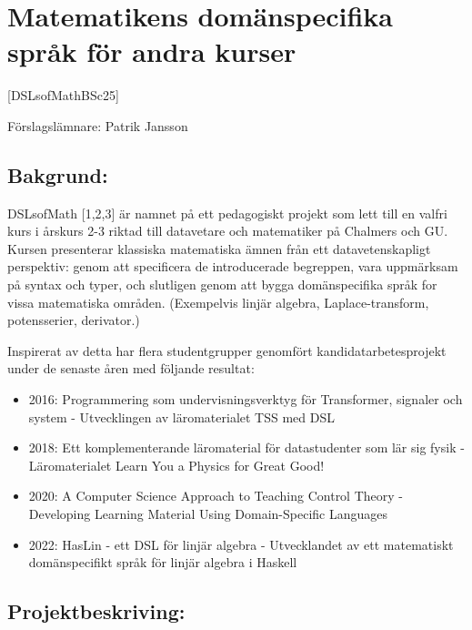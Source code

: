\documentclass{article}
\author{}
\date{}
\providecommand{\tightlist}{%
  \setlength{\itemsep}{0pt}\setlength{\parskip}{0pt}}
\begin{document}
\section{Matematikens domänspecifika språk för andra kurser}\label{dslsofmath-matematikens-domuxe4nspecifika-spruxe5k-fuxf6r-andra-kurser}
[DSLsofMathBSc25]

Förslagslämnare: Patrik Jansson

\begin{abstract}

\end{abstract}

\subsection{Bakgrund:}\label{bakgrund}

DSLsofMath {[}1,2,3{]} är namnet på ett pedagogiskt projekt som lett
till en valfri kurs i årskurs 2-3 riktad till datavetare och matematiker
på Chalmers och GU. Kursen presenterar klassiska matematiska ämnen från
ett datavetenskapligt perspektiv: genom att specificera de introducerade
begreppen, vara uppmärksam på syntax och typer, och slutligen genom att
bygga domänspecifika språk for vissa matematiska områden. (Exempelvis
linjär algebra, Laplace-transform, potensserier, derivator.)

Inspirerat av detta har flera studentgrupper genomfört
kandidatarbetesprojekt under de senaste åren med följande resultat:

\begin{itemize}
\tightlist
\item
  2016: Programmering som undervisningsverktyg för Transformer, signaler
  och system - Utvecklingen av läromaterialet TSS med DSL
\item
  2018: Ett komplementerande läromaterial för datastudenter som lär sig
  fysik - Läromaterialet Learn You a Physics for Great Good!
\item
  2020: A Computer Science Approach to Teaching Control Theory -
  Developing Learning Material Using Domain-Specific Languages
\item
  2022: HasLin - ett DSL för linjär algebra - Utvecklandet av ett
  matematiskt domänspecifikt språk för linjär algebra i Haskell
\end{itemize}

\subsection{Projektbeskriving:}\label{projektbeskriving}
\end{document}
